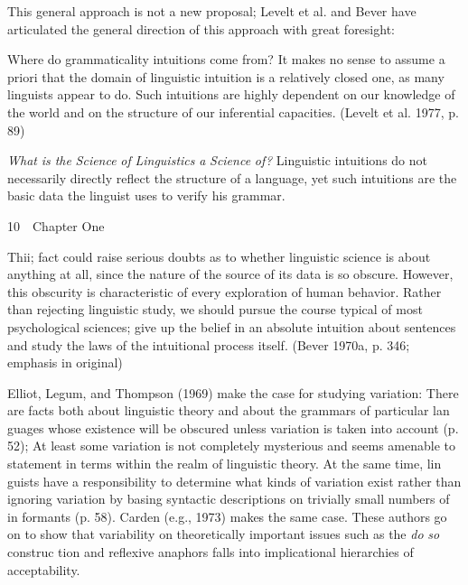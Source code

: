 \begin{styleTextbody}
This general approach is not a new proposal; Levelt et al. and Bever have articulated the general direction of this approach with great foresight:
\end{styleTextbody}


\begin{styleTextbody}
Where do grammaticality intuitions come from? It makes no sense to assume a priori that the domain of linguistic intuition is a relatively closed one, as many linguists appear to do. Such intuitions are highly dependent on our knowledge of the world and on the structure of our inferential capacities. (Levelt et al. 1977, p. 89)
\end{styleTextbody}


\begin{styleStandard}
\textit{What}\textit{ }\textit{is the}\textit{ }\textit{Science}\textit{ }\textit{of}\textit{ }\textit{Linguistics}\textit{ }\textit{a}\textit{ }\textit{Science}\textit{ }\textit{of?}\textit{ }Linguistic intuitions do not necessarily directly reflect the structure of a language, yet such intuitions are the basic data the linguist uses to verify his grammar.
\end{styleStandard}


\clearpage\setcounter{page}{1}\begin{styleStandard}
10\ \ Chapter One
\end{styleStandard}


\begin{styleTextbody}
Thii; fact could raise serious doubts as to whether linguistic science is about anything at all, since the nature of the source of its data is so obscure. However, this obscurity is characteristic of every exploration of human behavior. Rather than rejecting linguistic study, we should pursue the course typical of most psychological sciences; give up the belief in an {\textquotedbl}absolute{\textquotedbl} intuition about sentences and study the laws of the intuitional process itself. (Bever 1970a, p. 346; emphasis in original)
\end{styleTextbody}


\begin{styleTextbody}
Elliot, Legum, and Thompson (1969) make the case for studying variation: {\textquotedbl}There are facts both about linguistic theory and about the grammars of particular lan\- guages whose existence will be obscured unless variation is taken into account{\textquotedbl} (p. 52); {\textquotedbl}At least some variation is not completely mysterious and seems amenable to statement in terms within the realm of linguistic theory. At the same time, lin\- guists have a responsibility to determine what kinds of variation exist rather than ignoring variation by basing syntactic descriptions on trivially small numbers of in\- formants{\textquotedbl} (p. 58). Carden (e.g., 1973) makes the same case. These authors go on to show that variability on theoretically important issues such as the \textit{do}\textit{ }\textit{so}\textit{ }construc\- tion and reflexive anaphors falls into implicational hierarchies of acceptability.
\end{styleTextbody}


